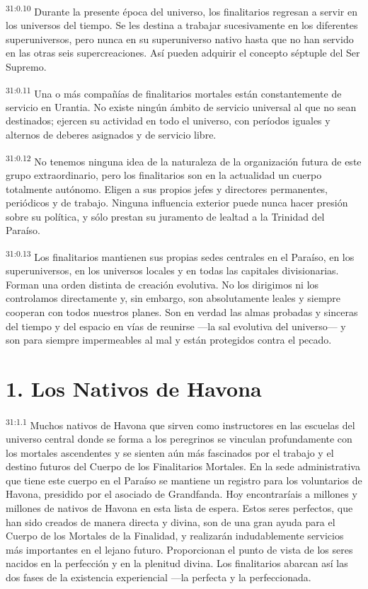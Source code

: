 \par
\textsuperscript{31:0.10} Durante la presente época del universo, los finalitarios regresan a servir en los universos del tiempo. Se les destina a trabajar sucesivamente en los diferentes superuniversos, pero nunca en su superuniverso nativo hasta que no han servido en las otras seis supercreaciones. Así pueden adquirir el concepto séptuple del Ser Supremo.

\par
\textsuperscript{31:0.11} Una o más compañías de finalitarios mortales están constantemente de servicio en Urantia. No existe ningún ámbito de servicio universal al que no sean destinados; ejercen su actividad en todo el universo, con períodos iguales y alternos de deberes asignados y de servicio libre.

\par
\textsuperscript{31:0.12} No tenemos ninguna idea de la naturaleza de la organización futura de este grupo extraordinario, pero los finalitarios son en la actualidad un cuerpo totalmente autónomo. Eligen a sus propios jefes y directores permanentes, periódicos y de trabajo. Ninguna influencia exterior puede nunca hacer presión sobre su política, y sólo prestan su juramento de lealtad a la Trinidad del Paraíso.

\par
\textsuperscript{31:0.13} Los finalitarios mantienen sus propias sedes centrales en el Paraíso, en los superuniversos, en los universos locales y en todas las capitales divisionarias. Forman una orden distinta de creación evolutiva. No los dirigimos ni los controlamos directamente y, sin embargo, son absolutamente leales y siempre cooperan con todos nuestros planes. Son en verdad las almas probadas y sinceras del tiempo y del espacio en vías de reunirse ---la sal evolutiva del universo--- y son para siempre impermeables al mal y están protegidos contra el pecado.

\section*{1. Los Nativos de Havona}
\par
\textsuperscript{31:1.1} Muchos nativos de Havona que sirven como instructores en las escuelas del universo central donde se forma a los peregrinos se vinculan profundamente con los mortales ascendentes y se sienten aún más fascinados por el trabajo y el destino futuros del Cuerpo de los Finalitarios Mortales. En la sede administrativa que tiene este cuerpo en el Paraíso se mantiene un registro para los voluntarios de Havona, presidido por el asociado de Grandfanda. Hoy encontraríais a millones y millones de nativos de Havona en esta lista de espera. Estos seres perfectos, que han sido creados de manera directa y divina, son de una gran ayuda para el Cuerpo de los Mortales de la Finalidad, y realizarán indudablemente servicios más importantes en el lejano futuro. Proporcionan el punto de vista de los seres nacidos en la perfección y en la plenitud divina. Los finalitarios abarcan así las dos fases de la existencia experiencial ---la perfecta y la perfeccionada.

